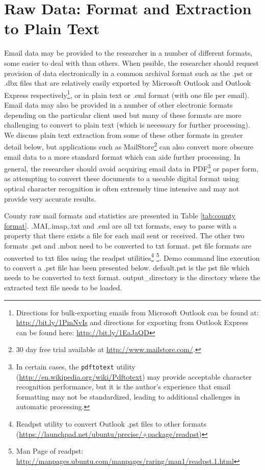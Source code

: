 \documentclass[fleqn]{MJDArticle}
\begin{document}
\section{Raw Data: Format and Extraction to Plain Text}
 
 Email data may be provided to the researcher in a number of different formats, some easier to deal with than others. When pssible, the researcher should request provision of data electronically in a common archival format such as the .pst or .dbx files that are relatively easily exported by Microsoft Outlook and Outlook Express respectively\footnote{Directions for bulk-exporting emails from Microsoft Outlook can be found at: \href{http://bit.ly/1PmNvIs}{http://bit.ly/1PmNvIs} and directions for exporting from Outlook Express can be found here: \href{http://bit.ly/1EaJaQD}{http://bit.ly/1EaJaQD}}, or in plain text or .eml format (with one file per email). Email data may also be provided in a number of other electronic formats depending on the particular client used but many of these formats are more challenging to convert to plain text (which is necessary for further processing). We discuss plain text extraction from some of these other formats in greater detail below, but applications such as MailStore\footnote{30 day free trial available at \href{http://www.mailstore.com/}{http://www.mailstore.com/}.} can also convert more obscure email data to a more standard format which can aide further processing. In general, the researcher should avoid acquiring email data in PDF\footnote{In certain cases, the \texttt{pdftotext} utility (\href{http://en.wikipedia.org/wiki/Pdftotext}{http://en.wikipedia.org/wiki/Pdftotext}) may provide acceptable character recognition performance, but it is the author's experience that email formatting may not be standardized, leading to additional challenges in automatic processing.} or paper form, as attempting to convert these documents to a useable digital format using optical character recognition is often extremely time intensive and may not provide very accurate results. \par
   County raw mail formats and statistics are presented in Table \ref{tab:county format}. .MAI,.imap,.txt and .eml are all txt formats, easy to parse with a property that there exists a file for each mail sent or received. The other two formats .pst and .mbox need to be converted to txt format. pst file formats are converted to txt files using the readpst utilities\footnote{Readpst utility to convert Outlook .pst files to other formats (\href{https://launchpad.net/ubuntu/precise/+package/readpst}{https://launchpad.net/ubuntu/precise/+package/readpst}) } \footnote{Man Page of readpst: \href{http://manpages.ubuntu.com/manpages/raring/man1/readpst.1.html}{http://manpages.ubuntu.com/manpages/raring/man1/readpst.1.html}}. Demo command line execution to convert a .pst file has been presented below. default.pst is the pst file which needs to be converted to text format. output\_directory is the directory where the extracted text file needs to be loaded.
\end{document}

